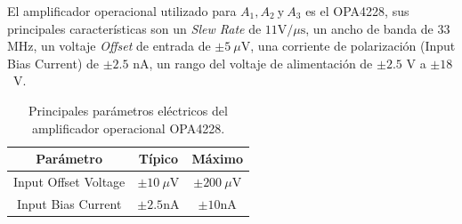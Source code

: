 El amplificador operacional utilizado para $A_1, A_2~\mbox{y}~A_3$ es el OPA4228, sus principales características  son un \textit{Slew Rate} de $11 \mbox{V/}\mu\mbox{s}$, un ancho de banda de $33~$MHz, un voltaje \textit{Offset} de entrada de $\pm5~\mu$V, una corriente de polarización (Input Bias Current) de $\pm2.5$ nA, un rango del voltaje de alimentación de $\pm2.5$ V a $\pm18$~V.%
\begin{table}[h!]
\caption{Principales parámetros eléctricos del amplificador operacional OPA4228.}
    \label{table_PID_c}
	\centering
	\begin{tabular}{ c  c  c}
    \hline
    Parámetro     & Típico     &   Máximo  \\ \hline
    \multicolumn{1}{c}{Input Offset Voltage}      & $\pm10~\mu$V        & $\pm200~\mu$V          \\
    \multicolumn{1}{c}{Input Bias Current}      & $\pm2.5$nA        & $\pm10$nA         \\ \hline
	\end{tabular}
\end{table}
